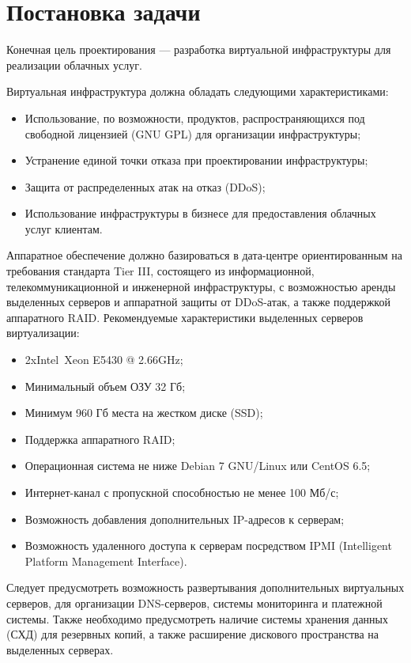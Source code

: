 \section{Постановка задачи}

Конечная цель проектирования --- разработка виртуальной инфраструктуры для реализации облачных услуг.

Виртуальная инфраструктура должна обладать следующими характеристиками:
\begin{itemize}
    \item Использование, по возможности, продуктов, распространяющихся под свободной лицензией (GNU GPL) для организации инфраструктуры;
    \item Устранение единой точки отказа при проектировании инфраструктуры;
    \item Защита от распределенных атак на отказ (DDoS);
    \item Использование инфраструктуры в бизнесе для предоставления облачных услуг клиентам.
\end{itemize}

Аппаратное обеспечение должно базироваться в дата-центре ориентированным на требования стандарта Tier III, состоящего из информационной, телекоммуникационной и инженерной инфраструктуры, с возможностью аренды выделенных серверов и аппаратной защиты от DDoS-атак, а также поддержкой аппаратного RAID.
Рекомендуемые характеристики выделенных серверов виртуализации:
\begin{itemize}
    \item 2xIntel\textregistered~Xeon E5430 @ 2.66GHz;
    \item Минимальный объем ОЗУ 32 Гб;
    \item Минимум 960 Гб места на жестком диске (SSD);
    \item Поддержка аппаратного RAID;
    \item Операционная система не ниже Debian 7 GNU/Linux или CentOS 6.5;
    \item Интернет-канал с пропускной способностью не менее 100 Мб/с;
    \item Возможность добавления дополнительных IP-адресов к серверам;
    \item Возможность удаленного доступа к серверам посредством IPMI (Intelligent Platform Management Interface).
\end{itemize}

Следует предусмотреть возможность развертывания дополнительных виртуальных серверов, для организации DNS-серверов, системы мониторинга и платежной системы.
Также необходимо предусмотреть наличие системы хранения данных (СХД) для резервных копий, а также расширение дискового пространства на выделенных серверах.

